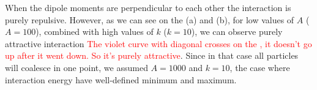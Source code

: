 
When the dipole moments are perpendicular to each other the interaction is purely repulsive. However, as we can see on the (a) and (b), for low values of $A$ ($A = 100$), combined with high values of $k$ ($k = 10$), we can observe purely attractive interaction \textcolor{red}{The violet curve with diagonal crosses on the , it doesn't go up after it went down. So it's purely attractive}. Since in that case all particles will coalesce in one point, we assumed $A = 1000$ and $k = 10$, the case where interaction energy have well-defined minimum and maximum.
